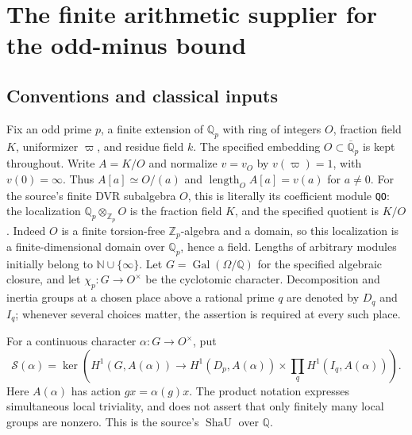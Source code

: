\section{The finite arithmetic supplier for the odd-minus bound}
\label{sec:odd-minus-supplier}


\subsection{Conventions and classical inputs}

Fix an odd prime $p$, a finite extension of $\mathbb Q_p$ with ring of
integers $O$, fraction field $K$, uniformizer $\varpi$, and residue field
$k$.  The specified embedding $O\subset\overline{\mathbb Q}_p$ is kept
throughout.  Write $A=K/O$ and normalize $v=v_O$ by $v(\varpi)=1$,
with $v(0)=\infty$.  Thus $A[a]\simeq O/(a)$ and
$\operatorname{length}_O A[a]=v(a)$ for $a\ne0$.
For the source's finite DVR subalgebra $O$, this is literally its
coefficient module \texttt{QO}: the localization
$\mathbb Q_p\otimes_{\mathbb Z_p}O$ is the fraction field $K$,
and the specified quotient is $K/O$.  Indeed $O$ is a finite
torsion-free $\mathbb Z_p$-algebra and a domain, so this localization
is a finite-dimensional domain over $\mathbb Q_p$, hence a field.
Lengths of arbitrary modules initially belong to
$\mathbb N\cup\{\infty\}$.  Let $G=\operatorname{Gal}(\Omega/\mathbb Q)$
for the specified algebraic closure, and let $\chi_p:G\to O^\times$ be
the cyclotomic character.  Decomposition and inertia groups at a chosen
place above a rational prime $q$ are denoted by $D_q$ and $I_q$; whenever
several choices matter, the assertion is required at every such place.

For a continuous character $\alpha:G\to O^\times$, put
\[
 \mathscr S(\alpha)=\ker\!\left(
 H^1(G,A(\alpha))\longrightarrow
 H^1(D_p,A(\alpha))\times\prod_q H^1(I_q,A(\alpha))\right).
 \tag{OS.1}
\]
Here $A(\alpha)$ has action $g x=\alpha(g)x$.  The product notation
expresses simultaneous local triviality, and does not assert that only
finitely many local groups are nonzero.  This is the source's
$\operatorname{ShaU}$ over $\mathbb Q$.

